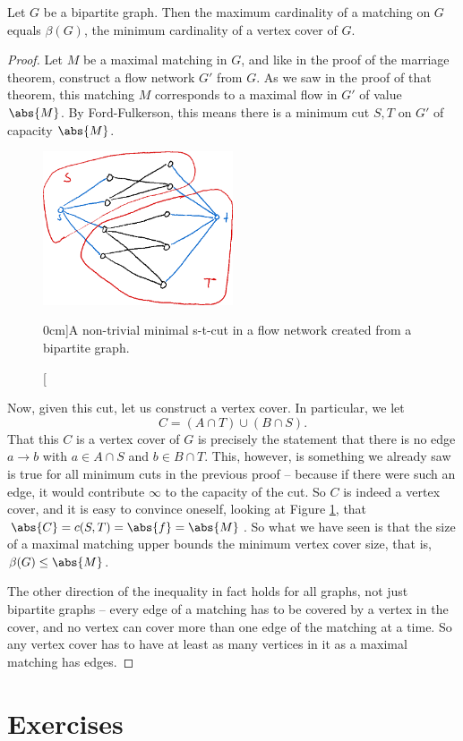 \documentclass[nobib]{tufte-handout}
\begin{document}
\begin{theorem}
    Let $G$ be a bipartite graph. Then the maximum cardinality of a matching on $G$ equals $\beta(G)$, the minimum cardinality of a vertex cover of $G$.

    \begin{proof}
        Let $M$ be a maximal matching in $G$, and like in the proof of the marriage theorem, construct a flow network $G'$ from $G$. As we saw in the proof of that theorem, this matching $M$ corresponds to a maximal flow in $G'$ of value $\abs{M}$. By Ford-Fulkerson, this means there is a minimum cut $S, T$ on $G'$ of capacity $\abs{M}$.

        \begin{figure}
            \centering
            \includegraphics[width=0.5\textwidth]{graphics/L7_flows/bipartite_s_t_cut.png}
            \caption[][0cm]{A non-trivial minimal s-t-cut in a flow network created from a bipartite graph.}
            \label{fig:minimal_s_t_cut}
        \end{figure}

        Now, given this cut, let us construct a vertex cover. In particular, we let
        $$C = (A \cap T) \cup (B \cap S).$$
        That this $C$ is a vertex cover of $G$ is precisely the statement that there is no edge $a \to b$ with $a \in A \cap S$ and $b \in B \cap T$. This, however, is something we already saw is true for all minimum cuts in the previous proof -- because if there were such an edge, it would contribute $\infty$ to the capacity of the cut. So $C$ is indeed a vertex cover, and it is easy to convince oneself, looking at Figure \ref{fig:minimal_s_t_cut}, that $\abs{C} = c(S,T) = \abs{f} = \abs{M}$. So what we have seen is that the size of a maximal matching upper bounds the minimum vertex cover size, that is, $\beta(G) \leq \abs{M}$. 
        
        The other direction of the inequality in fact holds for all graphs, not just bipartite graphs -- every edge of a matching has to be covered by a vertex in the cover, and no vertex can cover more than one edge of the matching at a time. So any vertex cover has to have at least as many vertices in it as a maximal matching has edges.
    \end{proof}
\end{theorem}


\section{Exercises}


%
%
\end{document}

